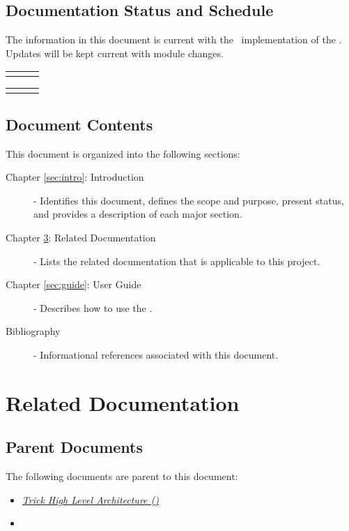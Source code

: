 \documentclass[twoside,11pt,titlepage]{report}
\begin{document}
\section{Documentation Status and Schedule}
The information in this document is current with the \TrickHLAid\
implementation of the \MODEL. Updates will be kept current with
module changes.

\begin{tabular}{||l|l|l|} \hline
\documentHistory
\end{tabular}

\begin{tabular}{||l|l|l|} \hline
\DocumentChangeHistory
\end{tabular}

\section{Document Contents}
This document is organized into the following sections:

\begin{description}

\item[Chapter \ref{sec:intro}: Introduction] -
Identifies this document, defines the scope and purpose, present status,
and provides a description of each major section.

\item[Chapter \ref{sec:docs}: Related Documentation] -
Lists the related documentation that is applicable to this project.

\item[Chapter \ref{sec:guide}: User Guide] -
Describes how to use the \MODEL.

\item[Bibliography] -
Informational references associated with this document.

\end{description}

\chapter{Related Documentation}\label{sec:docs}

\section{Parent Documents}
The following documents are parent to this document:

\begin{itemize}
\item{\href{file:\TRICKHLAHOME/docs/TrickHLA.pdf}
           {\em Trick High Level Architecture (\TrickHLA)}}
\cite{trickhlaenv:TrickHLA}

\item{\href{file:MODEL.pdf}
           {\em \MODEL}}
\cite{trickhlaenv:MODEL}
\end{itemize}
\end{document}
